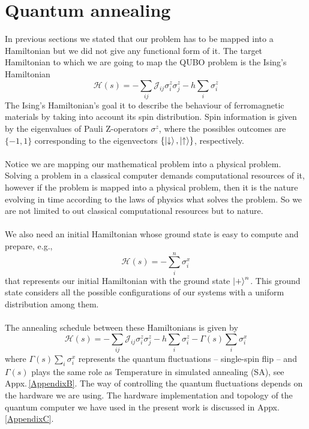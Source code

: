 \section{Quantum annealing}
In previous sections we stated that our problem has to be mapped into a Hamiltonian but we did not give any functional form of it. The target Hamiltonian to which we are going to map the QUBO problem is the Ising's Hamiltonian
\begin{equation}
    \mathcal{H}(s) = -\sum_{ij}\mathcal{J}_{ij}\sigma_{i}^{z}\sigma_{j}^{z} - h\sum_{i}\sigma_{i}^{z}
\end{equation}
The Ising's Hamiltonian's goal it to describe the behaviour of ferromagnetic materials by taking into account its spin distribution. Spin information is given by the eigenvalues of Pauli Z-operators $\sigma^{z}$, where the possibles outcomes are $\{-1,1\}$ corresponding to the eigenvectors $\{\ket{\downarrow},\ket{\uparrow}\}$, respectively.\\\\
Notice we are mapping our mathematical problem into a physical problem. Solving a problem in a classical computer demands computational resources of it, however if the problem is mapped into a physical problem, then it is the nature evolving in time according to the laws of physics what solves the problem. So we are not limited to out classical computational resources but to nature.\\\\
We also need an initial Hamiltonian whose ground state is easy to compute and prepare, e.g.,
\begin{equation}
    \mathcal{H}(s) = -\sum_{i}^{n}\sigma_{i}^{x}
\end{equation}
that represents our initial Hamiltonian with the ground state $\ket{+}^{n}$. This ground state considers all the possible configurations of our systems with a uniform distribution among them.\\\\
The annealing schedule between these Hamiltonians is given by
\begin{equation}
    \mathcal{H}(s) = -\sum_{ij}\mathcal{J}_{ij}\sigma_{i}^{z}\sigma_{j}^{z} - h\sum_{i}\sigma_{i}^{z} - \Gamma(s)\sum_{i}\sigma_{i}^{x}
\end{equation}
where $\Gamma(s)\sum_{i}\sigma_{i}^{x}$ represents the quantum fluctuations -- single-spin flip -- and $\Gamma(s)$ plays the same role as Temperature in simulated annealing (SA), see Appx.\,\ref{AppendixB}. The way of controlling the quantum fluctuations depends on the hardware we are using. The hardware implementation and topology of the quantum computer we have used in the present work is discussed in Appx.\,\ref{AppendixC}.\\\\
